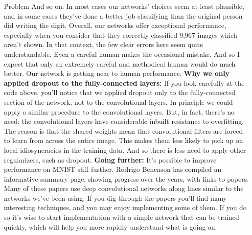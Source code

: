 \begin{exerciseBox}{Problem}
And so on. In most cases our networks' choices seem at least plausible, and in some cases they've done a better job classifying than the original person did writing the digit. Overall, our networks offer exceptional performance, especially when you consider that they correctly classified 9,967 images which aren't shown. In that context, the few clear errors here seem quite understandable. Even a careful human makes the occasional mistake. And so I expect that only an extremely careful and methodical human would do much better. Our network is getting near to human performance. \textbf{Why we only applied dropout to the fully-connected layers:} If you look carefully at the code above, you'll notice that we applied dropout only to the fully-connected section of the network, not to the convolutional layers. In principle we could apply a similar procedure to the convolutional layers. But, in fact, there's no need: the convolutional layers have considerable inbuilt resistance to overfitting. The reason is that the shared weights mean that convolutional filters are forced to learn from across the entire image. This makes them less likely to pick up on local idiosyncracies in the training data. And so there is less need to apply other regularizers, such as dropout. \textbf{Going further:} It's possible to improve performance on MNIST still further. Rodrigo Benenson has compiled an informative summary page, showing progress over the years, with links to papers. Many of these papers use deep convolutional networks along lines similar to the networks we've been using. If you dig through the papers you'll find many interesting techniques, and you may enjoy implementing some of them. If you do so it's wise to start implementation with a simple network that can be trained quickly, which will help you more rapidly understand what is going on.



\end{exerciseBox}
